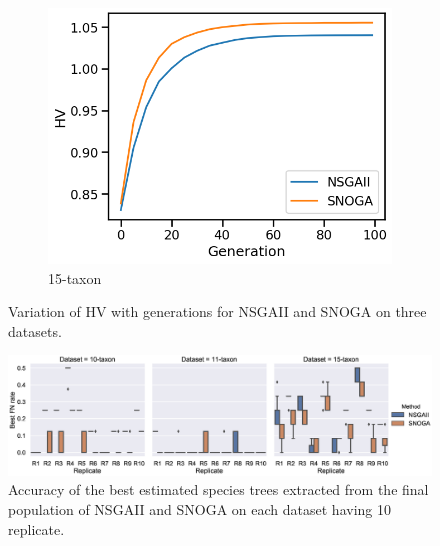 \begin{figure}[!htbp]
\begin{subfigure}[b]{0.3\textwidth}
			\includegraphics[width=\textwidth]{Figure/15-taxon_hv}
			\caption{15-taxon}
		\end{subfigure}
		\caption{Variation of HV with generations for NSGAII and SNOGA on three datasets.}
		\label{fig:gen_wise_hv}
\end{figure}

\begin{figure} [!htbp]
	\centering
	\begin{adjustwidth}{-0cm}{-0cm}
		\includegraphics[width=1\textwidth]{Figure/emo_boxplot}
	\end{adjustwidth}
	\caption{Accuracy of the best estimated species trees extracted from the final population of NSGAII and SNOGA on each dataset having 10 replicate.} \label{fig:emo_compare}	
\end{figure}


